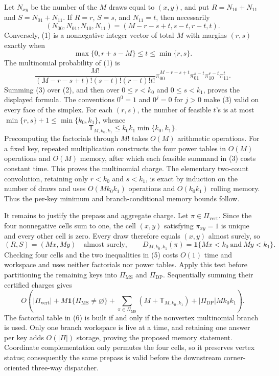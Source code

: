 Let \(N_{xy}\) be the number of the \(M\) draws equal to \((x,y)\), and put \(R=N_{10}+N_{11}\) and \(S=N_{01}+N_{11}\). If \(R=r\), \(S=s\), and \(N_{11}=t\), then necessarily
\[
(N_{00},N_{01},N_{10},N_{11})=(M-r-s+t,s-t,r-t,t).
\tag{1}
\]
Conversely, (1) is a nonnegative integer vector of total \(M\) with margins \((r,s)\) exactly when
\[
\max\{0,r+s-M\}\le t\le\min\{r,s\}.
\tag{2}
\]
The multinomial probability of (1) is
\[
\frac{M!}{(M-r-s+t)!(s-t)!(r-t)!t!}
\pi_{00}^{M-r-s+t}\pi_{01}^{s-t}\pi_{10}^{r-t}\pi_{11}^{t}.
\tag{3}
\]
Summing (3) over (2), and then over \(0\le r<k_0\) and \(0\le s<k_1\), proves the displayed formula. The conventions \(0^0=1\) and \(0^j=0\) for \(j>0\) make (3) valid on every face of the simplex. For each \((r,s)\), the number of feasible \(t\)'s is at most \(\min\{r,s\}+1\le\min\{k_0,k_1\}\), whence
\[
\mathsf T_{M,k_0,k_1}\le k_0k_1\min\{k_0,k_1\}.
\tag{4}
\]
Precomputing the factorials through \(M!\) takes \(O(M)\) arithmetic operations. For a fixed key, repeated multiplication constructs the four power tables in \(O(M)\) operations and \(O(M)\) memory, after which each feasible summand in (3) costs constant time. This proves the multinomial charge. The elementary two-count convolution, retaining only \(r<k_0\) and \(s<k_1\), is exact by induction on the number of draws and uses \(O(Mk_0k_1)\) operations and \(O(k_0k_1)\) rolling memory. Thus the per-key minimum and branch-conditional memory bounds follow.

It remains to justify the prepass and aggregate charge. Let \(\pi\in\Pi_{\mathrm{vert}}\). Since the four nonnegative cells sum to one, the cell \((x,y)\) satisfying \(\pi_{xy}=1\) is unique and every other cell is zero. Every draw therefore equals \((x,y)\) almost surely, so
\[
(R,S)=(Mx,My)\quad\text{almost surely},
\qquad
D_{M,k_0,k_1}(\pi)=\mathbf 1\{Mx<k_0\ \text{and}\ My<k_1\}.
\tag{5}
\]
Checking four cells and the two inequalities in (5) costs \(O(1)\) time and workspace and uses neither factorials nor power tables. Apply this test before partitioning the remaining keys into \(\Pi_{\mathrm{MS}}\) and \(\Pi_{\mathrm{DP}}\). Sequentially summing their certified charges gives
\[
O\!\left(|\Pi_{\mathrm{vert}}|+M\mathbf 1\{\Pi_{\mathrm{MS}}\ne\varnothing\}+\sum_{\pi\in\Pi_{\mathrm{MS}}}(M+\mathsf T_{M,k_0,k_1})+|\Pi_{\mathrm{DP}}|Mk_0k_1\right).
\tag{6}
\]
The factorial table in (6) is built if and only if the nonvertex multinomial branch is used. Only one branch workspace is live at a time, and retaining one answer per key adds \(O(|\Pi|)\) storage, proving the proposed memory statement. Coordinate complementation only permutes the four cells, so it preserves vertex status; consequently the same prepass is valid before the downstream corner-oriented three-way dispatcher.